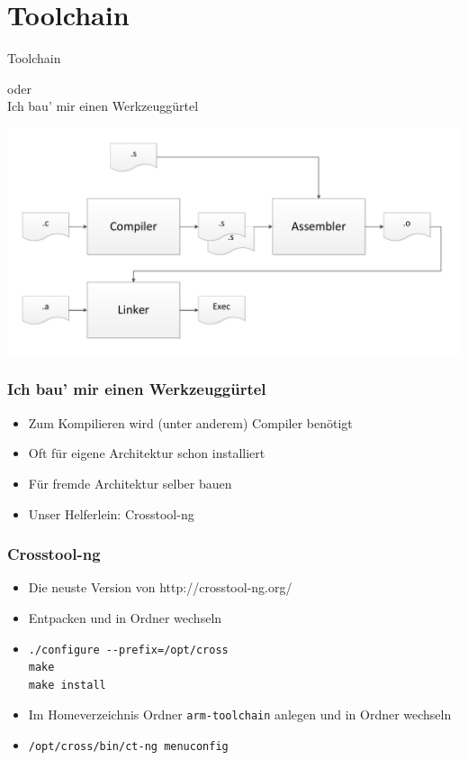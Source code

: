 \documentclass{beamer}
\begin{document}
\section{Toolchain}
\begin{frame}
\begin{center}
\begin{Huge}
Toolchain\\
\end{Huge}
oder\\
{\LARGE \glqq Ich bau' mir einen Werkzeuggürtel\grqq}
\end{center}
\end{frame}

\begin{frame}
\includegraphics[scale=.35]{image/Toolchain.pdf} 
\end{frame}

\begin{frame}
\frametitle{Ich bau' mir einen Werkzeuggürtel}
\begin{itemize}
\item Zum Kompilieren wird (unter anderem) Compiler benötigt
\item Oft für eigene Architektur schon installiert
\item Für fremde Architektur selber bauen
\item Unser Helferlein: Crosstool-ng
\end{itemize}
\end{frame}

\begin{frame}[fragile]
\frametitle{Crosstool-ng}
\begin{itemize}
\item Die neuste Version von http://crosstool-ng.org/
\item Entpacken und in Ordner wechseln
\item \begin{verbatim}
./configure --prefix=/opt/cross
make
make install
\end{verbatim}
\item Im Homeverzeichnis Ordner \verb+arm-toolchain+ anlegen und in Ordner wechseln
\item \begin{verbatim}
/opt/cross/bin/ct-ng menuconfig
\end{verbatim}
\end{itemize}
\end{frame}
\end{document}
